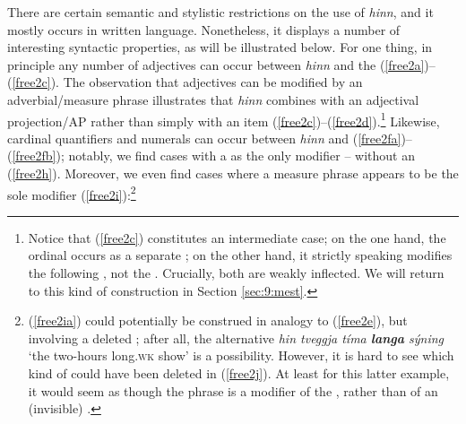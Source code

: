 \documentclass[output=paper,colorlinks,citecolor=brown]{langscibook}
\begin{document}
There are certain semantic and stylistic restrictions on the use of \textit{hinn}, and it mostly occurs in written language. Nonetheless, it displays a number of interesting syntactic properties, as will be illustrated below.  
For one thing, in principle any number of adjectives can occur between \textit{hinn} and the  (\ref{free2a})--(\ref{free2c}). The observation that adjectives can be modified by an adverbial/measure phrase illustrates that \textit{hinn} combines with an adjectival projection/AP rather than simply with an  item (\ref{free2c})--(\ref{free2d}).\footnote{\label{strange}Notice that (\ref{free2c}) constitutes an  intermediate case; on the one hand, the ordinal  occurs as a separate  ; on the other hand, it  strictly speaking modifies the following  , not the . Crucially, both are weakly inflected.  We will return to this kind  of construction in Section  \ref{sec:9:mest}.} Likewise, cardinal quantifiers and numerals can occur between \textit{hinn} and  (\ref{free2fa})--(\ref{free2fb}); notably, we find cases  with a  as the only modifier -- without an  (\ref{free2h}). Moreover, we even find cases where a measure  phrase appears to be the sole modifier (\ref{free2i}):\footnote{(\ref{free2ia}) could potentially be construed in analogy to (\ref{free2e}), but involving a deleted ; after all, the alternative \textit{hin tveggja tíma \textbf{langa} sýning} `the two-hours long.\textsc{wk} show' is a possibility. However, it is hard to see which kind of  could have been deleted in (\ref{free2j}). At least for this latter example, it would seem as though the  phrase is a modifier of the , rather than of an (invisible) .   }
\end{document}
